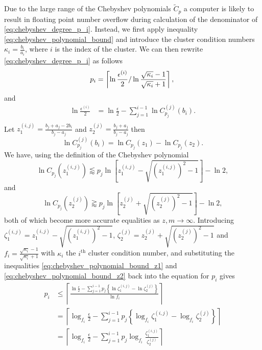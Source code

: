 Due to the large range of the Chebyshev polynomials $\tilde{C}_p$ a computer is likely to result in floating point number overflow during calculation of the denominator of \cref{eq:chebyshev_degree_p_i}. Instead, we first apply inequality \ref{eq:chebyshev_polynomial_bound} and introduce the cluster condition numbers $\kappa_i = \frac{b_i}{a_i}$, where $i$ is the index of the cluster. We can then rewrite \cref{eq:chebyshev_degree_p_i} as follows
\begin{equation*}
    p_i  =  \left\lceil\ln{\frac{\epsilon^{(i)}}{2}} / \ln{\frac{\sqrt{\kappa_i} - 1}{\sqrt{\kappa_i} + 1}}\right\rceil, \\
\end{equation*}
and
\begin{align*}
    \ln{\frac{\epsilon^{(i)}}{2}} & = \ln{\frac{\epsilon}{2}} - \sum_{j=1}^{i-1} \ln{C^{(j)}_{p_j}(b_i)}. \\
\end{align*}
Let $z^{(i,j)}_1 = \frac{b_j + a_j - 2b_i}{b_j - a_j}$ and $z^{(j)}_2 = \frac{b_j + a_j}{b_j - a_j}$ then
\begin{equation*}
    \ln{C^{(j)}_{p_j}(b_i)} = \ln{C_{p_j}(z_1)} - \ln{C_{p_j}(z_2)}.
\end{equation*}
We have, using the definition of the Chebyshev polynomial
\begin{equation}
    \ln{C_{p_j}(z^{(i,j)}_1)} \lessapprox p_j \ln{\left[z^{(i,j)}_1 - \sqrt{\left(z^{(i,j)}_1\right)^2 - 1}\right]} - \ln{2},
    \label{eq:chebyshev_polynomial_bound_z1}
\end{equation}
and
\begin{equation}
    \ln{C_{p_j}(z^{(j)}_2)} \gtrapprox p_j \ln{\left[z^{(j)}_2 + \sqrt{\left(z^{(j)}_2\right)^2 - 1}\right]} - \ln{2},
    \label{eq:chebyshev_polynomial_bound_z2}
\end{equation}
both of which become more accurate equalities as $z,m\rightarrow\infty$. Introducing $\zeta^{(i,j)}_1 = z^{(i,j)}_1 - \sqrt{\left(z^{(i,j)}_1\right)^2 - 1}$, $\zeta^{(j)}_2 = z^{(j)}_2 + \sqrt{\left(z^{(j)}_2\right)^2 - 1}$ and $f_i = \frac{\sqrt{\kappa_i} - 1}{\sqrt{\kappa_i} + 1}$ with $\kappa_i$ the $i^{\text{th}}$ cluster condition number, and substituting the inequalities \ref{eq:chebyshev_polynomial_bound_z1} and \ref{eq:chebyshev_polynomial_bound_z2} back into the equation for $p_i$ gives
\begin{align*}
    p_i &\leq \left\lceil\frac{\ln{\frac{\epsilon}{2}} - \sum_{j=1}^{i-1} p_j\left\{\ln{\zeta^{(i,j)}_1} - \ln{\zeta^{(j)}_2} \right\}}{\ln{f_i}}\right\rceil \\
    &= \left\lceil\log_{f_i}{\frac{\epsilon}{2}} - \sum_{j=1}^{i-1} p_j\left\{\log_{f_i}{\zeta^{(i,j)}_1} - \log_{f_i}{\zeta^{(j)}_2} \right\}\right\rceil\\
    &= \left\lceil\log_{f_i}{\frac{\epsilon}{2}} - \sum_{j=1}^{i-1} p_j\log_{f_i}{\frac{\zeta^{(i,j)}_1}{\zeta^{(j)}_2}} \right\rceil
\end{align*}
